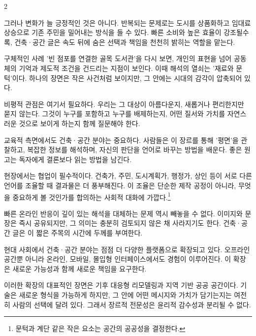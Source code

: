 \documentclass[9.5pt]{memoir}
\begin{document}
\begin{multicols*}{2}
{\bodyf\noindent 그러나 변화가 늘 긍정적인 것은 아니다. 반복되는 문제로는 도시를 상품화하고 임대료 상승으로 기존 주민을 밀어내는 방식을 들 수 있다. 빠른 소비와 높은 효율이 강조될수록, 건축·공간 글은 속도 뒤에 숨은 선택과 책임을 천천히 밝히는 역할을 맡는다.\par}


{\bodyf\noindent 구체적인 사례 '빈 점포를 연결한 골목 도서관'을 다시 보면, 개인의 표현을 넘어 공동체의 기억과 제도적 조건을 건드리는 지점이 보인다. 이때 해석의 열쇠는 '재료와 문턱'이다. 하나의 장면은 작은 사건처럼 보이지만, 그 안에는 시대의 감각이 압축되어 있다.\par}


{\bodyf\noindent 비평적 관점은 여기서 필요하다. 우리는 그 대상이 아름다운지, 새롭거나 편리한지만 묻지 않는다. 그것이 누구를 포함하고 누구를 배제하는지, 어떤 질서와 가치를 자연스러운 것으로 보이게 하는지 함께 질문해야 한다.\par}


{\bodyf\noindent 교육적 측면에서도 건축·공간 분야는 중요하다. 사람들은 이 장르를 통해 '평면'을 관찰하고, 복잡한 정보를 해석하며, 자신의 판단을 언어로 바꾸는 방법을 배운다. 좋은 원고는 독자에게 결론보다 읽는 방법을 남긴다.\par}


{\bodyf\noindent 현장에서는 협업이 필수적이다. 건축가, 주민, 도시계획가, 행정가, 상인 등이 서로 다른 언어를 조율할 때 결과물은 더 풍부해진다. 이 조율은 단순한 제작 공정이 아니라, 무엇을 중요하게 볼 것인가를 합의하는 사회적 대화에 가깝다.\footnote{문턱과 계단 같은 작은 요소는 공간의 공공성을 결정한다.}\par}


{\bodyf\noindent 빠른 온라인 반응이 깊이 있는 해석을 대체하는 문제 역시 빼놓을 수 없다. 이미지와 문장은 즉시 공유되지만, 그 의미는 충분히 검토되지 않은 채 사라지기도 한다. 건축·공간 글은 이 짧은 주목의 시간에 두께를 부여한다.\par}


{\bodyf\noindent 현대 사회에서 건축·공간 분야는 점점 더 다양한 플랫폼으로 확장되고 있다. 오프라인 공간뿐 아니라 온라인, 모바일, 몰입형 인터페이스에서도 경험이 이루어진다. 이 확장은 새로운 가능성과 함께 새로운 책임을 요구한다.\par}


{\bodyf\noindent 이러한 확장의 대표적인 장면은 기후 대응형 리모델링과 지역 기반 공공 공간이다. 기술은 새로운 형식을 가능하게 하지만, 그 안에 어떤 메시지와 가치가 담기는지는 여전히 사람의 선택에 달려 있다. 그래서 장르적 전문성은 윤리적 감수성과 분리될 수 없다.\par}



\end{multicols*}
\end{document}
